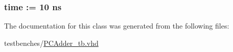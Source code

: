 \hypertarget{class_p_c_adder__tb_1_1behavior_ab3c46918aa1e58060e340ba6e16733a9}{
\subsubsection[{clk\-\_\-period}]{ {\bfseries time  \-:=  10  ns } }}\label{class_p_c_adder__tb_1_1behavior_ab3c46918aa1e58060e340ba6e16733a9}


\-The documentation for this class was generated from the following files\-:\begin{DoxyCompactItemize}
\item 
testbenches/\hyperlink{_p_c_adder__tb_8vhd}{\-P\-C\-Adder\-\_\-tb.\-vhd}\end{DoxyCompactItemize}
